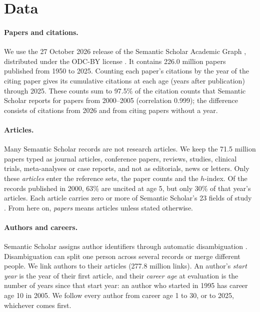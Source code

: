 \documentclass[11pt]{article}
\begin{document}
\section{Data}
\label{sec:data}

\paragraph{Papers and citations.} We use the 27 October 2026 release of the Semantic Scholar Academic Graph
\citep{kinney2023semantic}, distributed under the ODC-BY license \citep{s2datasets2026}. It contains 226.0 million
papers published from 1950 to 2025. Counting each paper's citations by the year of the citing paper gives its
cumulative citations at each age (years after publication) through 2025. These counts sum to 97.5\% of the
citation counts that Semantic Scholar reports for papers from 2000--2005 (correlation 0.999); the difference consists
of citations from 2026 and from citing papers without a year.

\paragraph{Articles.} Many Semantic Scholar records are not research articles. We keep the 71.5 million papers typed as
journal articles, conference papers, reviews, studies, clinical trials, meta-analyses or case reports, and not as
editorials, news or letters. Only these \emph{articles} enter the reference sets, the paper counts and the $h$-index.
Of the records published in 2000, 63\% are uncited at age 5, but only 30\% of that year's articles. Each article
carries zero or more of Semantic Scholar's 23 fields of study \citep{s2graphapi}. From here on, \emph{papers} means
articles unless stated otherwise.

\paragraph{Authors and careers.} Semantic Scholar assigns author identifiers through automatic disambiguation
\citep{kinney2023semantic}. Disambiguation can split one person across several records or merge different people. We
link authors to their articles (277.8 million links). An author's \emph{start year} is the year of their first
article, and their \emph{career age} at evaluation is the number of years since that start year: an author who started
in 1995 has career age 10 in 2005. We follow every author from career age 1 to 30, or to 2025, whichever comes first.
\end{document}
